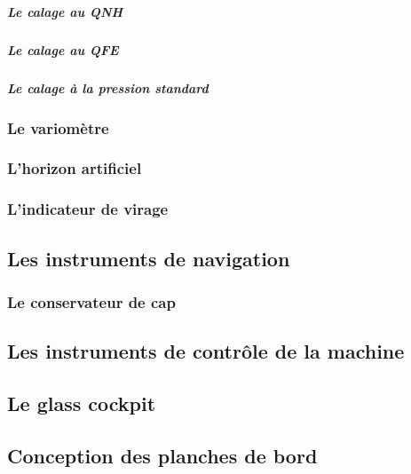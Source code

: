 	\subparagraph{Le calage au QNH}
	\subparagraph{Le calage au QFE}
	\subparagraph{Le calage à la pression standard}
	
	\subsubsection{Le variomètre}
	
	\begin{figure}[H]	
	\centering
	\end{figure}
	
	\subsubsection{L'horizon artificiel}
	
	\begin{figure}[H]	
	\centering
	\end{figure}
	
	\subsubsection{L'indicateur de virage}
	
	\begin{figure}[H]	
	\centering
	\end{figure}
	
	\subsection{Les instruments de navigation}
	\subsubsection{Le conservateur de cap}
	
	\begin{figure}[H]	
	\centering
	\end{figure}
	
	
	\subsection{Les instruments de contrôle de la machine}
	
	\subsection{Le glass cockpit}
	
	\subsection{Conception des planches de bord}